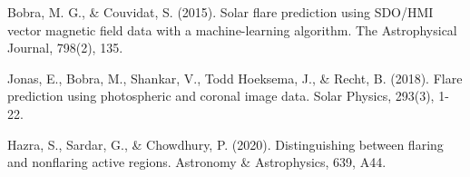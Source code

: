 
\begin{thebibliography}{99}

 Bobra, M. G., \& Couvidat, S. (2015). Solar flare prediction using SDO/HMI vector magnetic field data with a machine-learning algorithm. The Astrophysical Journal, 798(2), 135.

 Jonas, E., Bobra, M., Shankar, V., Todd Hoeksema, J., \& Recht, B. (2018). Flare prediction using photospheric and coronal image data. Solar Physics, 293(3), 1-22.

 Hazra, S., Sardar, G., \& Chowdhury, P. (2020). Distinguishing between flaring and nonflaring active regions. Astronomy \& Astrophysics, 639, A44.


\end{thebibliography}





